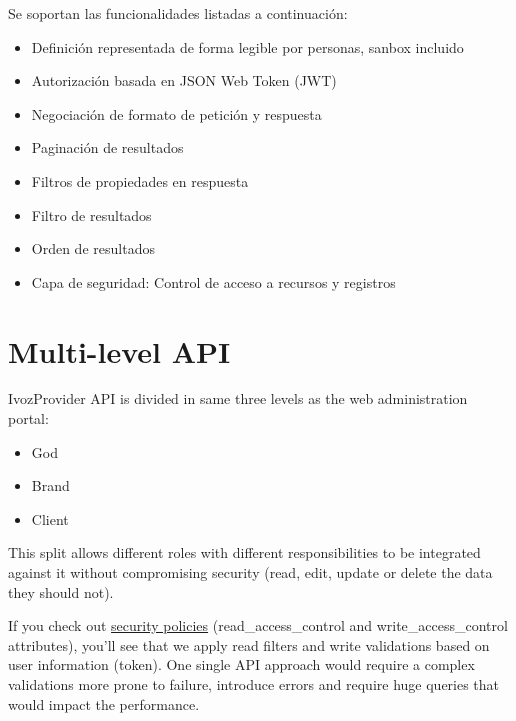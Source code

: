 \documentclass[letterpaper,10pt,spanish]{sphinxmanual}
\begin{document}
Se soportan las funcionalidades listadas a continuación:
\begin{itemize}
\item {} 
Definición representada de forma legible por personas, sanbox incluido

\item {} 
Autorización basada en JSON Web Token (JWT)

\item {} 
Negociación de formato de petición y respuesta

\item {} 
Paginación de resultados

\item {} 
Filtros de propiedades en respuesta

\item {} 
Filtro de resultados

\item {} 
Orden de resultados

\item {} 
Capa de seguridad: Control de acceso a recursos y registros

\end{itemize}


\chapter{Multi-level API}
\label{api_rest/multilevel::doc}\label{api_rest/multilevel:multi-level-api}
IvozProvider API is divided in same three levels as the web administration portal:
\begin{itemize}
\item {} 
God

\item {} 
Brand

\item {} 
Client

\end{itemize}

This split allows different roles with different responsibilities to be integrated against it without compromising
security (read, edit, update or delete the data they should not).

If you check out \href{https://github.com/irontec/ivozprovider/blob/bleeding/web/rest/brand/config/api/raw/provider.yml}{security policies}
(read\_access\_control and write\_access\_control attributes), you’ll see that we apply
read filters and write validations based on user information (token). One single API approach would require a complex
validations more prone to failure, introduce errors and require huge queries that would impact the performance.
\end{document}
